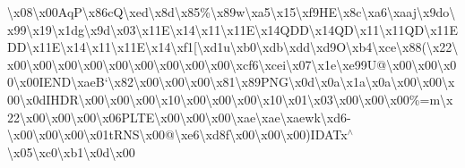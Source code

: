 \begin{DoxyCompactItemize}
\textbackslash{}x08\textbackslash{}x00\+Aq\+P\textbackslash{}x86c\+Q\textbackslash{}xed\textbackslash{}x8d\textbackslash{}x85\%\textbackslash{}x89w\textbackslash{}xa5\textbackslash{}x15\textbackslash{}xf9\+H\+E\textbackslash{}x8c\textbackslash{}xa6\textbackslash{}xaaj\textbackslash{}x9do\textbackslash{}x99\textbackslash{}x19\textbackslash{}x1dg\textbackslash{}x9d\textbackslash{}x03\textbackslash{}x11\+E\textbackslash{}x14\textbackslash{}x11\textbackslash{}x11\+E\textbackslash{}x14\+Q\+D\+D\textbackslash{}x14\+Q\+D\textbackslash{}x11\textbackslash{}x11\+Q\+D\textbackslash{}x11\+E\+D\+D\textbackslash{}x11\+E\textbackslash{}x14\textbackslash{}x11\textbackslash{}x11\+E\textbackslash{}x14\textbackslash{}xf1\mbox{[}\textbackslash{}xd1u\textbackslash{}xb0\textbackslash{}xdb\textbackslash{}xdd\textbackslash{}xd9\+O\textbackslash{}xb4\textbackslash{}xce\textbackslash{}x88(\textbackslash{}x22\textbackslash{}x00\textbackslash{}x00\textbackslash{}x00\textbackslash{}x00\textbackslash{}x00\textbackslash{}x00\textbackslash{}x00\textbackslash{}x00\textbackslash{}x00\textbackslash{}xcf6\textbackslash{}xcei\textbackslash{}x07\textbackslash{}x1e\textbackslash{}xe99\+U@\textbackslash{}x00\textbackslash{}x00\textbackslash{}x00\textbackslash{}x00\+I\+E\+N\+D\textbackslash{}xae\+B`\textbackslash{}x82\textbackslash{}x00\textbackslash{}x00\textbackslash{}x00\textbackslash{}x81\textbackslash{}x89\+P\+N\+G\textbackslash{}x0d\textbackslash{}x0a\textbackslash{}x1a\textbackslash{}x0a\textbackslash{}x00\textbackslash{}x00\textbackslash{}x00\textbackslash{}x0d\+I\+H\+D\+R\textbackslash{}x00\textbackslash{}x00\textbackslash{}x00\textbackslash{}x10\textbackslash{}x00\textbackslash{}x00\textbackslash{}x00\textbackslash{}x10\textbackslash{}x01\textbackslash{}x03\textbackslash{}x00\textbackslash{}x00\textbackslash{}x00\%=m\textbackslash{}x22\textbackslash{}x00\textbackslash{}x00\textbackslash{}x00\textbackslash{}x06\+P\+L\+T\+E\textbackslash{}x00\textbackslash{}x00\textbackslash{}x00\textbackslash{}xae\textbackslash{}xae\textbackslash{}xaewk\textbackslash{}xd6-\/\textbackslash{}x00\textbackslash{}x00\textbackslash{}x00\textbackslash{}x01t\+R\+N\+S\textbackslash{}x00@\textbackslash{}xe6\textbackslash{}xd8f\textbackslash{}x00\textbackslash{}x00\textbackslash{}x00)\+I\+D\+A\+Tx$^\wedge$\textbackslash{}x05\textbackslash{}xc0\textbackslash{}xb1\textbackslash{}x0d\textbackslash{}x00 
\end{DoxyCompactItemize}
